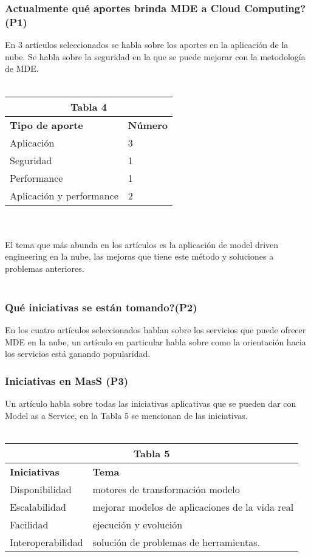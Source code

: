 \documentclass{llncs}
\begin{document}
\subsubsection{Actualmente qué aportes brinda MDE a Cloud Computing? (P1)}
En 3 artículos seleccionados se habla sobre los aportes en la aplicación de la nube. Se habla sobre la seguridad en la que se puede mejorar con la metodología de MDE.\\ \\

\begin{tabular}{  | p{5cm} | p{3cm} |}
  \hline
  \multicolumn{2}{|c|}{\bf Tabla 4} \\
  \hline
  \bf Tipo de aporte  & \bf Número \\
  \hline
  Aplicación & 3 \\
  \hline
  Seguridad & 1 \\
  \hline
   Performance & 1 \\
   \hline
   Aplicación y performance & 2 \\
   \hline
\end{tabular}
\\ \\
El tema que más abunda en los artículos es la aplicación de model driven engineering en la nube, las mejoras que tiene este método y soluciones a problemas anteriores. \\ \\

\subsubsection{Qué iniciativas se están tomando?(P2)}
En los cuatro artículos seleccionados hablan sobre los servicios que puede ofrecer MDE en la nube, un artículo en particular habla sobre como  la orientación hacia los servicios está ganando popularidad.
\subsubsection{Iniciativas en MasS (P3)}
Un artículo habla sobre todas las iniciativas aplicativas que se pueden dar con Model as a Service, en la Tabla 5 se mencionan de las iniciativas.
\\ \\
\begin{tabular}{  | p{4cm} | p{7cm} |}
  \hline
  \multicolumn{2}{|c|}{\bf Tabla 5} \\
  \hline
  \bf Iniciativas  & \bf Tema \\
  \hline
   Disponibilidad & motores de transformación modelo \\
  \hline
   Escalabilidad & mejorar modelos de aplicaciones de la vida real \\
  \hline
   Facilidad & ejecución y evolución \\
  \hline
   Interoperabilidad & solución de problemas de herramientas. \\
  \hline
\end{tabular}
\\
\end{document}
